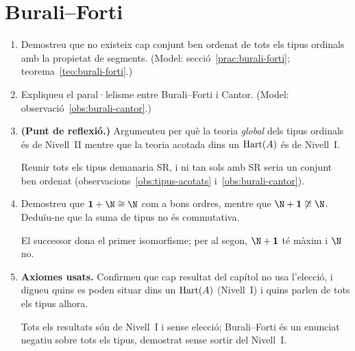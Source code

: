 \section{Burali--Forti}

\begin{enumerate}[resume]
  \item Demostreu que no existeix cap conjunt ben ordenat de tots els tipus ordinals amb la propietat de segments. (Model: secció~\ref{prac:burali-forti}; teorema~\ref{teo:burali-forti}.)

  \item Expliqueu el paral·lelisme entre Burali--Forti i Cantor. (Model: observació~\ref{obs:burali-cantor}.)

  \item \textbf{(Punt de reflexió.)} Argumenteu per què la teoria \emph{global} dels tipus ordinals és de Nivell~II mentre que la teoria acotada dins un \(\operatorname{Hart}(A)\) és de Nivell~I. \begin{indicacio}Reunir tots els tipus demanaria SR, i ni tan sols amb SR seria un conjunt ben ordenat (observacions~\ref{obs:tipus-acotats} i~\ref{obs:burali-cantor}).\end{indicacio}

  \item Demostreu que \(\mathbf1+\N\cong\N\) com a bons ordres, mentre que \(\N+\mathbf1\not\cong\N\). Deduïu-ne que la suma de tipus no és commutativa. \begin{indicacio}El successor dona el primer isomorfisme; per al segon, \(\N+\mathbf1\) té màxim i \(\N\) no.\end{indicacio}

  \item \textbf{Axiomes usats.} Confirmeu que cap resultat del capítol no usa l'elecció, i digueu quins es poden situar dins un \(\operatorname{Hart}(A)\) (Nivell~I) i quins parlen de tots els tipus alhora. \begin{indicacio}Tots els resultats són de Nivell~I i sense elecció; Burali--Forti és un enunciat negatiu sobre tots els tipus, demostrat sense sortir del Nivell~I.\end{indicacio}
\end{enumerate}
